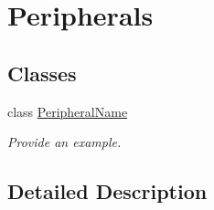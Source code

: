 \hypertarget{group___peripherals}{}\section{Peripherals}
\label{group___peripherals}
\subsection*{Classes}
\begin{DoxyCompactItemize}
\item 
class \mbox{\hyperlink{class_peripheral_name}{Peripheral\+Name}}
\begin{DoxyCompactList}\small\item\em Provide an example. \end{DoxyCompactList}\end{DoxyCompactItemize}


\subsection{Detailed Description}
